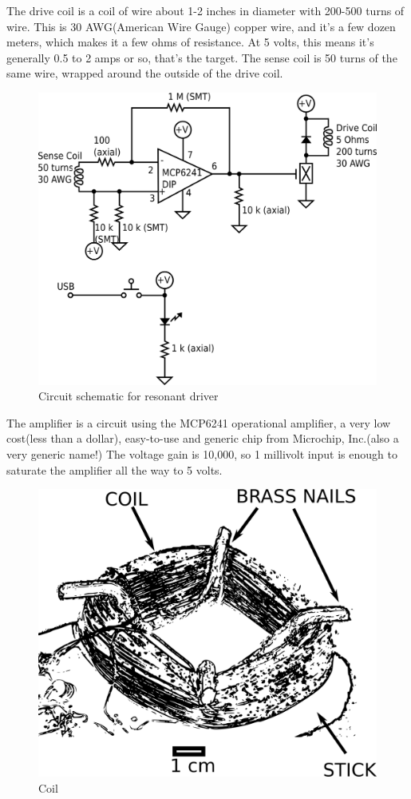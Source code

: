 The drive coil is a coil of wire about 1-2 inches in diameter with
200-500 turns of wire. This is 30 AWG(American Wire Gauge) copper wire,
and it's a few dozen meters, which makes it a few ohms of resistance. At
5 volts, this means it's generally 0.5 to 2 amps or so, that's the
target. The sense coil is 50 turns of the same wire, wrapped around the
outside of the drive coil.

\begin{figure}[htbp]
\centering
\includegraphics{images/resonantStick1.png}
\caption{Circuit schematic for resonant driver}
\end{figure}

The amplifier is a circuit using the MCP6241 operational amplifier, a
very low cost(less than a dollar), easy-to-use and generic chip from
Microchip, Inc.(also a very generic name!) The voltage gain is 10,000,
so 1 millivolt input is enough to saturate the amplifier all the way to
5 volts.

\begin{figure}[htbp]
\centering
\includegraphics{images/coilzoom.png}
\caption{Coil}
\end{figure}

